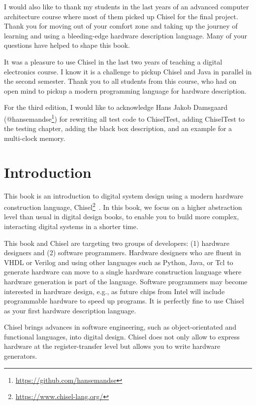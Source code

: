 \documentclass[%
    10pt,
    headinclude, footexclude,
    openright, %
    notitlepage,
    cleardoubleempty,
    headsepline,
    pointlessnumbers,
    bibtotoc, idxtotoc,
    ]{scrbook}
\newcommand{\myref}[2]{\href{#1}{#2}}
\renewcommand{\myref}[2]{{#2}{\footnote{\url{#1}}}}
\begin{document}
I would also like to thank my students in the last years of an advanced computer
architecture course where most of them picked up Chisel for the final project.
Thank you for moving out of your comfort zone and taking up the journey of
learning and using a bleeding-edge hardware description language.
Many of your questions have helped to shape this book.

It was a pleasure to use Chisel in the last two years of teaching a digital electronics
course. I know it is a challenge to pickup Chisel and Java in parallel in the second
semester. Thank you to all students from this course, who had on open mind to
pickup a modern programming language for hardware description.

For the third edition, I would like to acknowledge Hans Jakob Damsgaard
(\myref{https://github.com/hansemandse}{@hansemandse}) for rewriting
all test code to ChiselTest, adding ChiselTest to the testing chapter, adding the black
box description, and an example for a multi-clock memory.


\mainmatter

\chapter{Introduction}
\label{sec:intro}

This book is an introduction to digital system design using a modern hardware
construction language, \myref{https://www.chisel-lang.org/}{Chisel}~\cite{chisel:dac2012}.
In this book, we focus on a higher abstraction level than usual in digital design books,
to enable you to build more complex, interacting digital systems in a shorter time.

This book and Chisel are targeting two groups of developers:
(1) hardware designers and (2) software programmers.
Hardware designers who are fluent in VHDL or Verilog and using other languages such as Python,
Java, or Tcl to generate hardware can move to a single hardware construction language
where hardware generation is part of the language.
Software programmers may become interested in hardware design,
e.g., as future chips from Intel will include programmable hardware to speed up programs.
It is perfectly fine to use Chisel as your first hardware description language.

Chisel brings advances in software engineering, such as object-orientated
and functional languages, into digital design.
Chisel does not only allow to express hardware at the register-transfer level
but allows you to write hardware generators.
\end{document}
